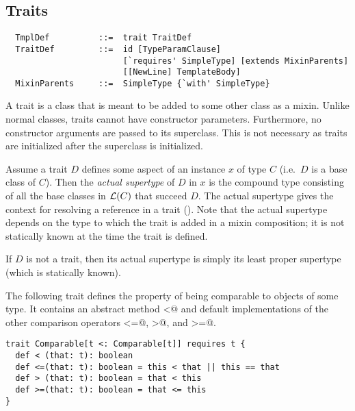 \subsection{Traits}
\label{sec:traits}

\syntax\begin{lstlisting}
  TmplDef          ::=  trait TraitDef
  TraitDef         ::=  id [TypeParamClause]
                        [`requires' SimpleType] [extends MixinParents] 
                        [[NewLine] TemplateBody]
  MixinParents     ::=  SimpleType {`with' SimpleType}
\end{lstlisting}

A trait is a class that is meant to be added to some other class
as a mixin. Unlike normal classes, traits cannot have
constructor parameters. Furthermore, no constructor arguments are
passed to its superclass. This is not necessary as traits are
initialized after the superclass is initialized.

Assume a trait $D$ defines some aspect of an instance $x$ of
type $C$ (i.e.\ $D$ is a base class of $C$). Then the {\em actual
supertype} of $D$ in $x$ is the compound type consisting of all the
base classes in ${\cal L}(C)$ that succeed $D$.  The actual supertype gives
the context for resolving a  reference in a trait
(). Note that the actual supertype depends 
on the type to which the trait is added in a mixin composition; it is not
statically known at the time the trait is defined.

If $D$ is not a trait, then its actual supertype is simply its
least proper supertype (which is statically known).

\example\label{ex:comparable} The following trait defines the property
of being comparable to objects of some type. It contains an abstract
method \lstinline@<@ and default implementations of the other
comparison operators \lstinline@<=@, \lstinline@>@, and
\lstinline@>=@. 

\begin{lstlisting}
trait Comparable[t <: Comparable[t]] requires t { 
  def < (that: t): boolean
  def <=(that: t): boolean = this < that || this == that
  def > (that: t): boolean = that < this 
  def >=(that: t): boolean = that <= this
}
\end{lstlisting}

